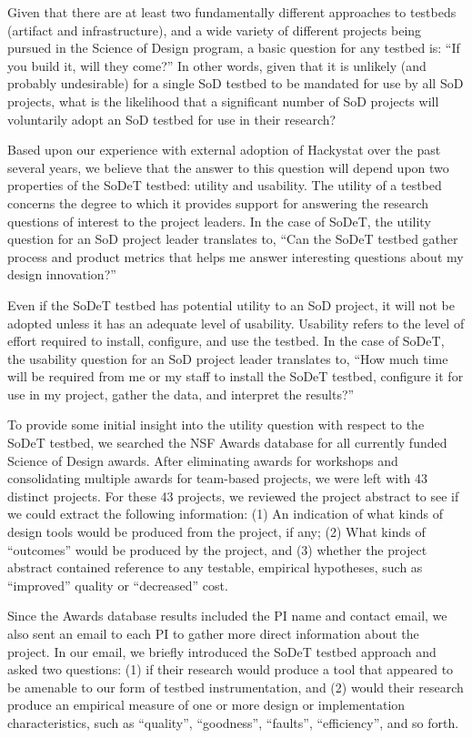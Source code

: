 Given that there are at least two fundamentally different approaches to
testbeds (artifact and infrastructure), and a wide variety of different
projects being pursued in the Science of Design program, a basic question
for any testbed is: ``If you build it, will they come?''  In other words,
given that it is unlikely (and probably undesirable) for a single SoD
testbed to be mandated for use by all SoD projects, what is the likelihood
that a significant number of SoD projects will voluntarily adopt an SoD
testbed for use in their research?

Based upon our experience with external adoption of Hackystat over the past
several years, we believe that the answer to this question will depend upon two
properties of the SoDeT testbed: utility and usability.  The utility of a testbed
concerns the degree to which it provides support for answering the research
questions of interest to the project leaders.  In the case of SoDeT, the
utility question for an SoD project leader translates to, ``Can the SoDeT
testbed gather process and product metrics that helps me answer interesting
questions about my design innovation?''

Even if the SoDeT testbed has potential utility to an SoD project, it will not be
adopted unless it has an adequate level of usability.  Usability refers to
the level of effort required to install, configure, and use the testbed.
In the case of SoDeT, the usability question for an SoD project leader
translates to, ``How much time will be required from me or my staff to
install the SoDeT testbed, configure it for use in my project, gather the data,
and interpret the results?''

To provide some initial insight into the utility question with respect to
the SoDeT testbed, we searched the NSF Awards database for all currently
funded Science of Design awards. After eliminating awards for workshops and
consolidating multiple awards for team-based projects, we were left with 43
distinct projects. For these 43 projects, we reviewed the project abstract
to see if we could extract the following information: (1) An indication of
what kinds of design tools would be produced from the project, if any; (2)
What kinds of ``outcomes'' would be produced by the project, and (3)
whether the project abstract contained reference to any testable, empirical
hypotheses, such as ``improved'' quality or ``decreased'' cost.

Since the Awards database results included the PI name and contact email,
we also sent an email to each PI to gather more direct information about
the project.  In our email, we briefly introduced the SoDeT testbed
approach and asked two questions: (1) if their research would produce a
tool that appeared to be amenable to our form of testbed instrumentation,
and (2) would their research produce an empirical measure of one or more
design or implementation characteristics, such as ``quality'',
``goodness'', ``faults'', ``efficiency'', and so forth.

